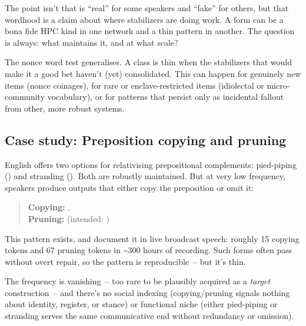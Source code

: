 The point isn't that  is \enquote{real} for some speakers and \enquote{fake} for others, but that wordhood is a claim about where stabilizers are doing work. A form can be a bona fide HPC kind in one network and a thin pattern in another. The question is always: what maintains it, and at what scale?

The nonce word test generalises. A class is thin when the stabilizers that would make it a good bet haven't (yet) consolidated. This can happen for genuinely new items (nonce coinages), for rare or enclave-restricted items (idiolectal or micro-community vocabulary), or for patterns that persist only as incidental fallout from other, more robust systems.

\subsection{Case study: Preposition copying and pruning}
\label{sec:8:preposition-copying}

English offers two options for relativising prepositional complements: pied-piping () and stranding (). Both are robustly maintained. But at very low frequency, speakers produce outputs that either copy the preposition or omit it:

\begin{quote}
\textbf{Copying:} , \\
\textbf{Pruning:}  (intended: )
\end{quote}

This pattern exists, and \textcite{radford2012} document it in live broadcast speech: roughly 15 copying tokens and 67 pruning tokens in \textasciitilde300 hours of recording. Such forms often pass without overt repair, so the pattern is reproducible~-- but it's thin.

The frequency is vanishing~-- too rare to be plausibly acquired as a \emph{target} construction~-- and there's no social indexing (copying/pruning signals nothing about identity, register, or stance) or functional niche (either pied-piping or stranding serves the same communicative end without redundancy or omission).

